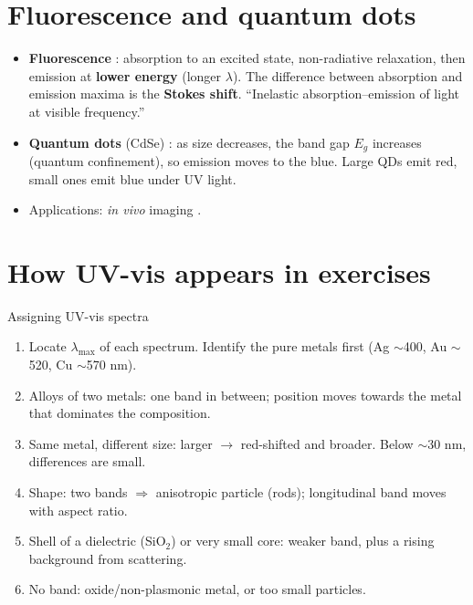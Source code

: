 \section{Fluorescence and quantum dots}
\begin{itemize}
  \item \textbf{Fluorescence} : absorption to an excited state, non-radiative relaxation, then emission
        at \textbf{lower energy} (longer $\lambda$). The difference between absorption and emission maxima is the
        \textbf{Stokes shift}. ``Inelastic absorption--emission of light at visible frequency.''
  \item \textbf{Quantum dots} (CdSe) : as size decreases, the band gap $E_g$ increases (quantum
        confinement), so emission moves to the blue. Large QDs emit red, small ones emit blue under UV light.
  \item Applications: \emph{in vivo} imaging .
\end{itemize}

\section{How UV-vis appears in exercises}
\begin{recipe}{Assigning UV-vis spectra}
\begin{enumerate}
  \item Locate $\lambda_\mathrm{max}$ of each spectrum. Identify the pure metals first (Ag $\sim$400, Au $\sim$520, Cu $\sim$570 nm).
  \item Alloys of two metals: one band in between; position moves towards the metal that dominates the composition.
  \item Same metal, different size: larger $\to$ red-shifted and broader. Below $\sim$30 nm, differences are small.
  \item Shape: two bands $\Rightarrow$ anisotropic particle (rods); longitudinal band moves with aspect ratio.
  \item Shell of a dielectric (SiO$_2$) or very small core: weaker band, plus a rising background from scattering.
  \item No band: oxide/non-plasmonic metal, or too small particles.
\end{enumerate}
\end{recipe}

